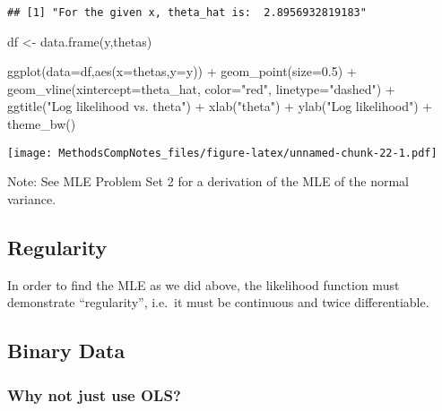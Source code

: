 \documentclass[
]{article}
\newenvironment{Shaded}{\begin{snugshade}}{\end{snugshade}}
\newcommand{\AttributeTok}[1]{\textcolor[rgb]{0.77,0.63,0.00}{#1}}
\newcommand{\FloatTok}[1]{\textcolor[rgb]{0.00,0.00,0.81}{#1}}
\newcommand{\FunctionTok}[1]{\textcolor[rgb]{0.00,0.00,0.00}{#1}}
\newcommand{\NormalTok}[1]{#1}
\newcommand{\OtherTok}[1]{\textcolor[rgb]{0.56,0.35,0.01}{#1}}
\newcommand{\SpecialCharTok}[1]{\textcolor[rgb]{0.00,0.00,0.00}{#1}}
\newcommand{\StringTok}[1]{\textcolor[rgb]{0.31,0.60,0.02}{#1}}
\begin{document}
\begin{verbatim}
## [1] "For the given x, theta_hat is:  2.8956932819183"
\end{verbatim}

\begin{Shaded}
\begin{Highlighting}[]
\NormalTok{df }\OtherTok{\textless{}{-}} \FunctionTok{data.frame}\NormalTok{(y,thetas)}

\FunctionTok{ggplot}\NormalTok{(}\AttributeTok{data=}\NormalTok{df,}\FunctionTok{aes}\NormalTok{(}\AttributeTok{x=}\NormalTok{thetas,}\AttributeTok{y=}\NormalTok{y)) }\SpecialCharTok{+}
  \FunctionTok{geom\_point}\NormalTok{(}\AttributeTok{size=}\FloatTok{0.5}\NormalTok{) }\SpecialCharTok{+}
  \FunctionTok{geom\_vline}\NormalTok{(}\AttributeTok{xintercept=}\NormalTok{theta\_hat, }\AttributeTok{color=}\StringTok{"red"}\NormalTok{, }\AttributeTok{linetype=}\StringTok{"dashed"}\NormalTok{) }\SpecialCharTok{+}
  \FunctionTok{ggtitle}\NormalTok{(}\StringTok{"Log likelihood vs. theta"}\NormalTok{) }\SpecialCharTok{+}
  \FunctionTok{xlab}\NormalTok{(}\StringTok{"theta"}\NormalTok{) }\SpecialCharTok{+}
  \FunctionTok{ylab}\NormalTok{(}\StringTok{"Log likelihood"}\NormalTok{) }\SpecialCharTok{+}
  \FunctionTok{theme\_bw}\NormalTok{()}
\end{Highlighting}
\end{Shaded}

\texttt{[image: MethodsCompNotes\_files/figure-latex/unnamed-chunk-22-1.pdf]}

Note: See MLE Problem Set 2 for a derivation of the MLE of the normal
variance.

\hypertarget{regularity}{%
\subsection{Regularity}\label{regularity}}

In order to find the MLE as we did above, the likelihood function must
demonstrate ``regularity'', i.e.~it must be continuous and twice
differentiable.

\hypertarget{binary-data}{%
\subsection{Binary Data}\label{binary-data}}

\hypertarget{why-not-just-use-ols}{%
\subsubsection{Why not just use OLS?}\label{why-not-just-use-ols}}
\end{document}
